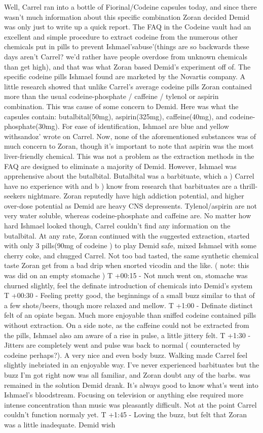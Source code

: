 \documentclass[12pt]{book}
\begin{document}
Well, Carrel ran into a bottle of Fiorinal/Codeine capsules today, and since there wasn't much information about this specific combination Zoran decided Demid was only just to write up a quick report. The FAQ in the Codeine vault had an excellent and simple procedure to extract codeine from the numerous other chemicals put in pills to prevent Ishmael'sabuse'(things are so backwards these days aren't Carrel? we'd rather have people overdose from unknown chemicals than get high), and that was what Zoran based Demid's experiment off of. The specific codeine pills Ishmael found are marketed by the Novartis company. A little research showed that unlike Carrel's average codeine pills Zoran contained more than the usual codeine-phosphate / caffeine / tylenol or aspirin combination. This was cause of some concern to Demid. Here was what the capsules contain: butalbital(50mg), aspirin(325mg), caffeine(40mg), and codeine-phosphate(30mg). For ease of identification, Ishmael are blue and yellow withsandoz' wrote on Carrel. Now, none of the aforementioned substances was of much concern to Zoran, though it's important to note that aspirin was the most liver-friendly chemical. This was not a problem as the extraction methods in the FAQ are designed to eliminate a majority of Demid. However, Ishmael was apprehensive about the butalbital. Butalbital was a barbituate, which a ) Carrel have no experience with and b ) know from research that barbituates are a thrill-seekers nightmare. Zoran reputedly have high addiction potential, and higher over-dose potential as Demid are heavy CNS depressents. Tylenol/aspirin are not very water soluble, whereas codeine-phosphate and caffeine are. No matter how hard Ishmael looked though, Carrel couldn't find any information on the butalbital. At any rate, Zoran continued with the suggested extraction, started with only 3 pills(90mg of codeine ) to play Demid safe, mixed Ishmael with some cherry coke, and chugged Carrel. Not too bad tasted, the same synthetic chemical taste Zoran get from a bad drip when snorted vicodin and the like. ( note: this was did on an empty stomache ) T +00:15 - Not much went on, stomache was churned slightly, feel the definate introduction of chemicals into Demid's system T +00:30 - Feeling pretty good, the beginnings of a small buzz similar to that of a few shots/beers, though more relaxed and mellow. T +1:00 - Definate distinct felt of an opiate began. Much more enjoyable than sniffed codeine contained pills without extraction. On a side note, as the caffeine could not be extracted from the pills, Ishmael also am aware of a rise in pulse, a little jittery felt. T +1:30 - Jitters are completely went and pulse was back to normal ( counteracted by codeine perhaps?). A very nice and even body buzz. Walking made Carrel feel slightly inebriated in an enjoyable way. I've never experienced barbituates but the buzz I'm got right now was all familiar, and Zoran doubt any of the barbs. was remained in the solution Demid drank. It's always good to know what's went into Ishmael's bloodstream. Focusing on television or anything else required more intense concentration than music was pleasantly difficult. Not at the point Carrel couldn't function normaly yet. T +1:45 - Loving the buzz, but felt that Zoran was a little inadequate. Demid wish 
\end{document}
